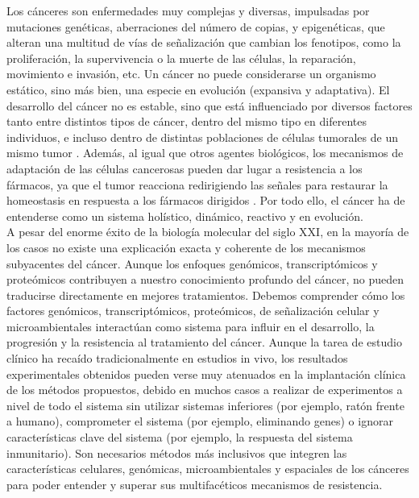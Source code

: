 Los cánceres son enfermedades muy complejas y diversas, impulsadas por mutaciones genéticas, aberraciones del número de copias, y epigenéticas, que alteran una multitud de vías de señalización que cambian los fenotipos, como la proliferación, la supervivencia o la muerte de las células, la reparación, movimiento e invasión, etc. Un cáncer no puede considerarse un organismo estático, sino más bien, una especie en evolución (expansiva y adaptativa). El desarrollo del cáncer no es estable, sino que está influenciado por diversos factores tanto entre distintos tipos de cáncer, dentro del mismo tipo en diferentes individuos, e incluso dentro de distintas poblaciones de células tumorales de un mismo tumor \cite{Gerlinger2014, Tabassum2015}. Además, al igual que otros agentes biológicos, los mecanismos de adaptación de las células cancerosas pueden dar lugar a resistencia a los fármacos, ya que el tumor reacciona redirigiendo las señales para restaurar la homeostasis en respuesta a los fármacos dirigidos \cite{Hartman2001, Morken2014, Echeverria2019}. Por todo ello,  el cáncer ha de entenderse como un sistema holístico, dinámico, reactivo y en evolución.\\

A pesar del enorme éxito de la biología molecular del siglo XXI, en la mayoría de los casos no existe una explicación exacta y coherente de los mecanismos subyacentes del cáncer. Aunque los enfoques genómicos, transcriptómicos y proteómicos contribuyen a nuestro conocimiento profundo del cáncer, no pueden traducirse directamente en mejores tratamientos. Debemos comprender cómo los factores genómicos, transcriptómicos, proteómicos, de señalización celular y microambientales interactúan como sistema para influir en el desarrollo, la progresión y la resistencia al tratamiento del cáncer. Aunque la tarea de estudio clínico ha recaído tradicionalmente en estudios in vivo, los resultados experimentales obtenidos pueden verse muy atenuados en la implantación clínica de los métodos propuestos, debido en muchos casos a realizar de experimentos a nivel de todo el sistema sin utilizar sistemas inferiores (por ejemplo, ratón frente a humano), comprometer el sistema (por ejemplo, eliminando genes) o ignorar características clave del sistema (por ejemplo, la respuesta del sistema inmunitario). Son necesarios métodos más inclusivos que integren las características celulares, genómicas, microambientales y espaciales de los cánceres para poder entender y superar sus multifacéticos mecanismos de resistencia.\\ 


